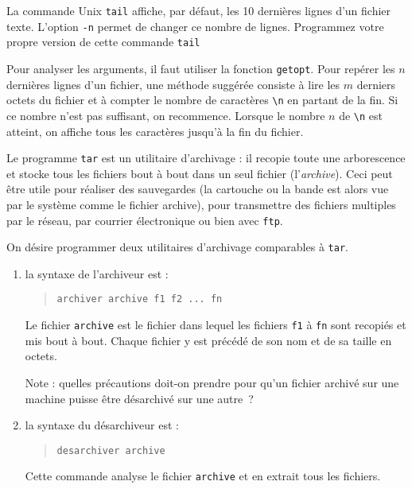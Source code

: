 \question

La commande Unix {\tt tail} affiche, par défaut, les 10 dernières lignes
d'un fichier texte. L'option {\tt -n} permet de changer ce nombre de
lignes. Programmez votre propre version de cette commande {\tt tail}

Pour analyser les arguments, il faut utiliser la fonction {\tt getopt}.
Pour repérer les $n$ dernières lignes d'un fichier, une méthode suggérée
consiste à lire les $m$ derniers octets du fichier et à compter le
nombre de caractères \verb|\n| en partant de la fin.  Si ce nombre n'est
pas suffisant, on recommence.  Lorsque le nombre $n$ de \verb|\n| est
atteint, on affiche tous les caractères jusqu'à la fin du fichier.


\question

Le programme {\tt tar} est un utilitaire d'archivage :  il recopie toute
une arborescence et stocke tous les fichiers bout à bout dans un seul
fichier (l'{\em archive}).  Ceci peut être utile pour réaliser des
sauvegardes (la cartouche ou la bande est alors vue par le système comme
le fichier archive), pour transmettre des fichiers multiples par le
réseau, par courrier électronique ou bien avec {\tt ftp}.

On désire programmer deux utilitaires d'archivage comparables à {\tt tar}.

\begin {enumerate}

    \item la syntaxe de l'archiveur est :

	\begin {quote}
	    \verb|archiver archive f1 f2 ... fn|
	\end {quote}

	Le fichier {\tt archive} est le fichier dans lequel les fichiers
	{\tt f1} à {\tt fn} sont recopiés et mis bout à bout.  Chaque
	fichier y est précédé de son nom et de sa taille en octets.

	Note : quelles précautions doit-on prendre pour qu'un fichier
	archivé sur une machine puisse être désarchivé sur une autre~?

    \item la syntaxe du désarchiveur est :

	\begin {quote}
	    \verb|desarchiver archive|
	\end {quote}

	Cette commande analyse le fichier {\tt archive} et en extrait
	tous les fichiers.

\end {enumerate}

